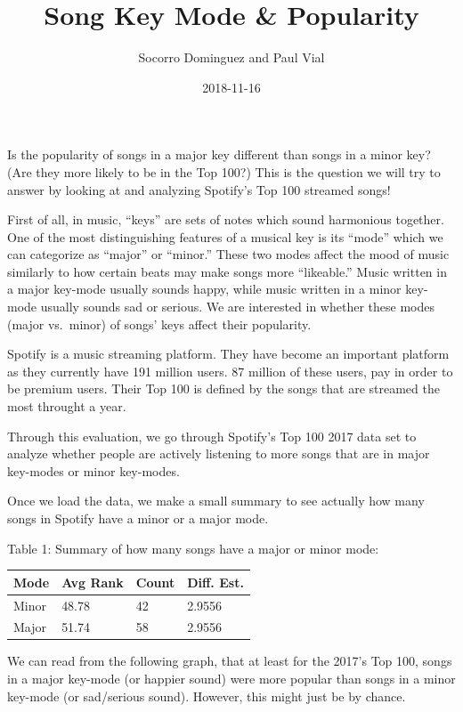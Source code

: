 \documentclass[]{article}
\title{Song Key Mode \& Popularity}
\author{Socorro Dominguez and Paul Vial}
\date{2018-11-16}
\begin{document}
\maketitle

Is the popularity of songs in a major key different than songs in a
minor key? (Are they more likely to be in the Top 100?) This is the
question we will try to answer by looking at and analyzing Spotify's Top
100 streamed songs!

First of all, in music, ``keys'' are sets of notes which sound
harmonious together. One of the most distinguishing features of a
musical key is its ``mode'' which we can categorize as ``major'' or
``minor.'' These two modes affect the mood of music similarly to how
certain beats may make songs more ``likeable.'' Music written in a major
key-mode usually sounds happy, while music written in a minor key-mode
usually sounds sad or serious. We are interested in whether these modes
(major vs.~minor) of songs' keys affect their popularity.

Spotify is a music streaming platform. They have become an important
platform as they currently have 191 million users. 87 million of these
users, pay in order to be premium users. Their Top 100 is defined by the
songs that are streamed the most throught a year.

Through this evaluation, we go through Spotify's Top 100 2017 data set
to analyze whether people are actively listening to more songs that are
in major key-modes or minor key-modes.

Once we load the data, we make a small summary to see actually how many
songs in Spotify have a minor or a major mode.

Table 1: Summary of how many songs have a major or minor mode:

\begin{longtable}[]{@{}llll@{}}
\toprule
Mode & Avg Rank & Count & Diff. Est.\tabularnewline
\midrule
\endhead
Minor & 48.78 & 42 & 2.9556\tabularnewline
Major & 51.74 & 58 & 2.9556\tabularnewline
\bottomrule
\end{longtable}

We can read from the following graph, that at least for the 2017's Top
100, songs in a major key-mode (or happier sound) were more popular than
songs in a minor key-mode (or sad/serious sound). However, this might
just be by chance.
\end{document}
